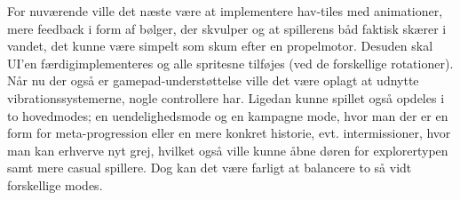 For nuværende ville det næste være at implementere hav-tiles med animationer, mere feedback i form af bølger, der skvulper og at spillerens båd faktisk skærer i vandet, det kunne være simpelt som skum efter en propelmotor. Desuden skal UI'en færdigimplementeres og alle spritesne tilføjes (ved de forskellige rotationer). Når nu der også er gamepad-understøttelse ville det være oplagt at udnytte vibrationssystemerne, nogle controllere har. Ligedan kunne spillet også opdeles i to hovedmodes; en uendelighedsmode og en kampagne mode, hvor man der er en form for meta-progression eller en mere konkret historie, evt. intermissioner, hvor man kan erhverve nyt grej, hvilket også ville kunne åbne døren for explorertypen samt mere casual spillere. Dog kan det være farligt at balancere to så vidt forskellige modes.

